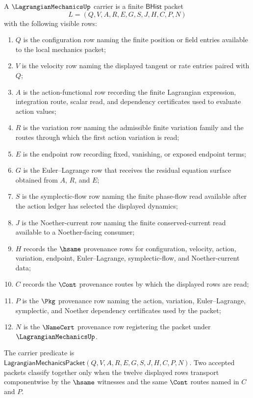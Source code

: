 \begin{definition}
\label{def:lagrangianmechanics-bhist-carrier}
A $\LagrangianMechanicsUp$ carrier is a finite $\mathsf{BHist}$ packet
$$
L=(Q,V,A,R,E,G,S,J,H,C,P,N)
$$
with the following visible rows:
\begin{enumerate}
\item $Q$ is the configuration row naming the finite position or field entries
available to the local mechanics packet;
\item $V$ is the velocity row naming the displayed tangent or rate entries
paired with $Q$;
\item $A$ is the action-functional row recording the finite Lagrangian
expression, integration route, scalar read, and dependency certificates used
to evaluate action values;
\item $R$ is the variation row naming the admissible finite variation family
and the routes through which the first action variation is read;
\item $E$ is the endpoint row recording fixed, vanishing, or exposed endpoint
terms;
\item $G$ is the Euler--Lagrange row that receives the residual equation
surface obtained from $A$, $R$, and $E$;
\item $S$ is the symplectic-flow row naming the finite phase-flow read
available after the action ledger has selected the displayed dynamics;
\item $J$ is the Noether-current row naming the finite conserved-current read
available to a Noether-facing consumer;
\item $H$ records the $\hsame$ provenance rows for configuration, velocity,
action, variation, endpoint, Euler--Lagrange, symplectic-flow, and
Noether-current data;
\item $C$ records the $\Cont$ provenance routes by which the displayed rows
are read;
\item $P$ is the $\Pkg$ provenance row naming the action, variation,
Euler--Lagrange, symplectic, and Noether dependency certificates used by the
packet;
\item $N$ is the $\NameCert$ provenance row registering the packet under
$\LagrangianMechanicsUp$.
\end{enumerate}
The carrier predicate is
$\mathsf{LagrangianMechanicsPacket}(Q,V,A,R,E,G,S,J,H,C,P,N)$. Two accepted
packets classify together only when the twelve displayed rows transport
componentwise by the $\hsame$ witnesses and the same $\Cont$ routes named in
$C$ and $P$.
\end{definition}

